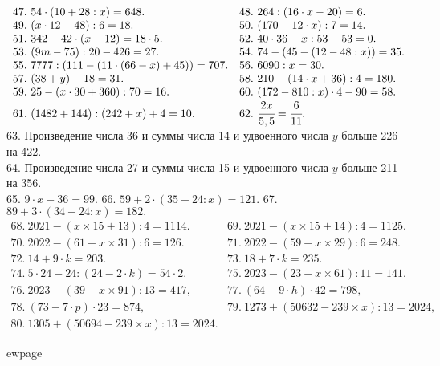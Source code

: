 $\begin{array}{ll}
47.\ 54\cdot(10+28:x)=648.&
48.\ 264:(16\cdot x-20)=6.\\
49.\ (x\cdot12-48):6=18.&
50.\ (170-12\cdot x):7=14.\\
51.\ 342-42\cdot(x-12)=18\cdot5.&
52.\ 40\cdot36-x:53-53=0.\\
53.\ (9m-75):20-426=27.&
54.\ 74-(45-(12-48:x))=35.\\
55.\ 7777:(111-(11\cdot(66-x)+45))=707.&
56.\ 6090:x=30.\\
57.\ (38+y)-18=31.&
58.\ 210-(14\cdot x+36):4=180.\\
59.\ 25-(x\cdot30+360):70=16.&
60.\ (172-810:x)\cdot4-90=58.\\
61.\ (1482+144):(242+x)+4=10.&
62.\ \cfrac{2x}{5,5}=\cfrac{6}{11}.
\end{array}$\\
63. Произведение числа 36 и суммы числа 14 и удвоенного числа $y$ больше 226 на 422.\\
64. Произведение числа 27 и суммы числа 15 и удвоенного числа $y$ больше 211 на 356.\\
65. $9\cdot x -36=99.$ 66. $59+2\cdot(35-24:x)=121.$ 67. $89+3\cdot(34-24:x)=182.$\\
$\begin{array}{ll}
68.\ 2021-(x\times15+13):4=1114.& 69.\ 2021-(x\times15+14):4=1125.\\
70.\ 2022-(61+x\times31):6=126.& 71.\ 2022-(59+x\times29):6=248.\\
72.\ 14+9\cdot k=203.& 73.\ 18+7\cdot k=235.\\
74.\ 5\cdot24-24:(24-2\cdot k)=54\cdot2.&
75.\ 2023 - (23 + x \times 61) : 11 = 141.\\
76.\ 2023 - (39 + x \times 91) : 13 = 417,&
77.\ (64 - 9 \cdot h) \cdot 42 = 798,\\
78.\ (73 - 7 \cdot p) \cdot 23 = 874,&
79.\ 1273+(50632-239\times x):13=2024,\\
80.\ 1305+(50694-239\times x):13=2024.
\end{array}$

ewpage
